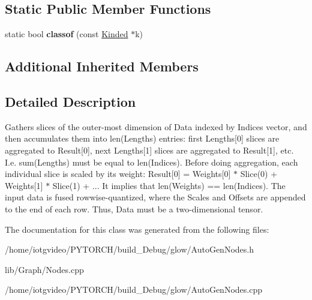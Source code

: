 \subsection*{Static Public Member Functions}
\begin{DoxyCompactItemize}
\item 
\mbox{\label{classglow_1_1_fused_rowwise_quantized_sparse_lengths_weighted_sum_node_a2f0d5f4b84918eb68b2382c18c951370}} 
static bool {\bfseries classof} (const \hyperlink{classglow_1_1_kinded}{Kinded} $\ast$k)
\end{DoxyCompactItemize}
\subsection*{Additional Inherited Members}


\subsection{Detailed Description}
Gathers slices of the outer-\/most dimension of Data indexed by Indices vector, and then accumulates them into len(\+Lengths) entries\+: first Lengths\mbox{[}0\mbox{]} slices are aggregated to Result\mbox{[}0\mbox{]}, next Lengths\mbox{[}1\mbox{]} slices are aggregated to Result\mbox{[}1\mbox{]}, etc. I.\+e. sum(\+Lengths) must be equal to len(\+Indices). Before doing aggregation, each individual slice is scaled by its weight\+: Result\mbox{[}0\mbox{]} = Weights\mbox{[}0\mbox{]} $\ast$ Slice(0) + Weights\mbox{[}1\mbox{]} $\ast$ Slice(1) + ... It implies that len(\+Weights) == len(\+Indices). The input data is fused rowwise-\/quantized, where the Scales and Offsets are appended to the end of each row. Thus, Data must be a two-\/dimensional tensor. 

The documentation for this class was generated from the following files\+:\begin{DoxyCompactItemize}
\item 
/home/iotgvideo/\+P\+Y\+T\+O\+R\+C\+H/build\+\_\+\+Debug/glow/Auto\+Gen\+Nodes.\+h\item 
lib/\+Graph/Nodes.\+cpp\item 
/home/iotgvideo/\+P\+Y\+T\+O\+R\+C\+H/build\+\_\+\+Debug/glow/Auto\+Gen\+Nodes.\+cpp\end{DoxyCompactItemize}
